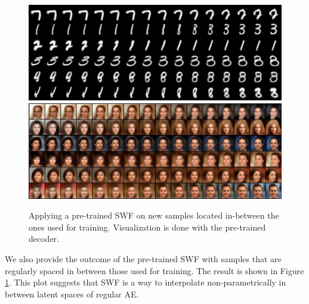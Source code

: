 \begin{figure}
\centering
\includegraphics[width=0.95\columnwidth]{figures/MNIST_interpolation_image_500.pdf}
\includegraphics[width=0.95\columnwidth]{figures/CelebA_interpolation_image_500.pdf}
\label{fig:interpolation}
\vspace{-\baselineskip}
\caption{Applying a pre-trained SWF on new samples located in-between the ones used for training. Visualization is done with the pre-trained decoder.}
\vspace{-10pt}
\end{figure}

We also provide the outcome of the pre-trained SWF with samples that are regularly spaced in between those used for training. The result is shown in Figure \ref{fig:interpolation}. This plot suggests that SWF is a way to interpolate non-parametrically in between latent spaces of regular AE.
























